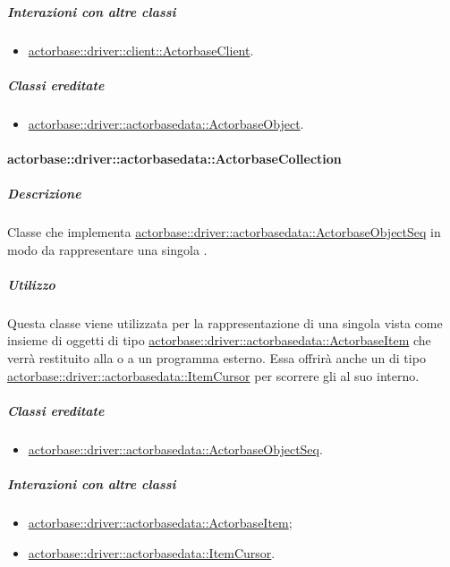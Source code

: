 \documentclass{scalatekids-article}
\begin{document}
\subparagraph{Interazioni con altre classi}

\begin{itemize}
\item \hyperref[sec:actorbase::driver::client::ActorbaseClient]{actorbase::driver::client::ActorbaseClient}.
\end{itemize}

\subparagraph{Classi ereditate}

\begin{itemize}
\item \hyperref[sec:actorbase::driver::actorbasedata::ActorbaseObject]{actorbase::driver::actorbasedata::ActorbaseObject}.
\end{itemize}

\paragraph{actorbase::driver::actorbasedata::ActorbaseCollection}
\label{sec:actorbase::driver::actorbasedata::ActorbaseCollection}

\subparagraph{Descrizione}

Classe che implementa \hyperref[sec:actorbase::driver::actorbasedata::ActorbaseObjectSeq]{actorbase::driver::actorbasedata::ActorbaseObjectSeq}
in modo da rappresentare una singola .

\subparagraph{Utilizzo}

Questa classe viene utilizzata per la rappresentazione di una singola
 vista come insieme di oggetti di tipo
\hyperref[sec:actorbase::driver::actorbasedata::ActorbaseItem]{actorbase::driver::actorbasedata::ActorbaseItem}
che verrà restituito alla  o a un programma esterno.
Essa offrirà anche un  di tipo
\hyperref[sec:actorbase::driver::actorbasedata::ItemCursor]{actorbase::driver::actorbasedata::ItemCursor}
per scorrere gli  al suo interno.

\subparagraph{Classi ereditate}

\begin{itemize}
\item \hyperref[sec:actorbase::driver::actorbasedata::ActorbaseObjectSeq]{actorbase::driver::actorbasedata::ActorbaseObjectSeq}.
\end{itemize}

\subparagraph{Interazioni con altre classi}

\begin{itemize}
\item \hyperref[sec:actorbase::driver::actorbasedata::ActorbaseItem]{actorbase::driver::actorbasedata::ActorbaseItem};
\item \hyperref[sec:actorbase::driver::actorbasedata::ItemCursor]{actorbase::driver::actorbasedata::ItemCursor}.
\end{itemize}
\end{document}
